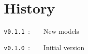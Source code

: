 \documentclass{article}
\begin{document}
\begin{PresentationCode}{}
\end{PresentationCode}

\begin{PresentationCode}{}
\end{PresentationCode}

\begin{PresentationCode}{}
\end{PresentationCode}

\newpage

\part{History}

\verb|v0.1.1|~:~~~~New models

\verb|v0.1.0|~:~~~~Initial version
\end{document}
